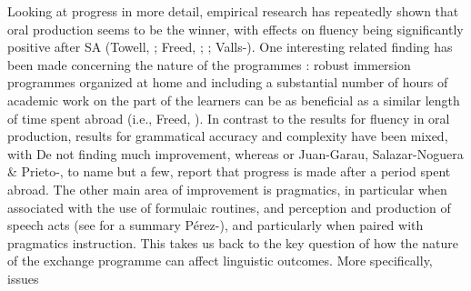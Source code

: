 Looking at progress in more detail, empirical research has repeatedly shown that oral production seems to be the winner, with effects on fluency being significantly positive after SA (Towell, \citealt{HawkinsBazergui1996}; Freed, \citealt{SegalowitzDewey2004}; \citealt{LlanesMuñoz2009}; Valls-\citealt{FerrerMora2014}). One interesting related finding has been made concerning the nature of the programmes \citep{Beattie2014}: robust immersion programmes organized at home and including a substantial number of hours of academic work on the part of the learners can be as beneficial as a similar length of time spent abroad (i.e., Freed, \citealt{SegalowitzDewey2004}). In contrast to the results for fluency in oral production, results for grammatical accuracy and complexity have been mixed, with De\citet{Keyser1991} not finding much improvement, whereas \citet{Howard2005} or Juan-Garau, Salazar-Noguera \& Prieto-\citet{Arranz2014}, to name but a few, report that progress is made after a period spent abroad. The other main area of improvement is pragmatics, in particular when associated with the use of formulaic routines, and perception and production of speech acts (see for a summary Pérez-\citealt{VidalShively2018}), and particularly when paired with pragmatics instruction. This takes us back to the key question of how the nature of the exchange programme can affect linguistic outcomes. More specifically, issues %
%
